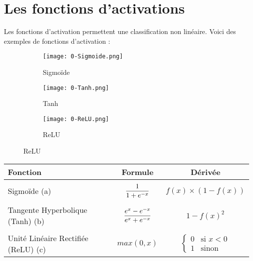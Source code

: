 \section{Les fonctions d'activations}
Les fonctions d'activation permettent une classification non linéaire. Voici des exemples de fonctions d'activation :
\begin{figure}[htbp!]
    \begin{subfigure}[]{0.32\textwidth}
        \texttt{[image: 0-Sigmoide.png]}
        \caption{Sigmoïde}
    \end{subfigure}
    \begin{subfigure}[]{0.32\textwidth}
        \texttt{[image: 0-Tanh.png]}
        \caption{Tanh}
    \end{subfigure}
    \begin{subfigure}[]{0.32\textwidth}
        \texttt{[image: 0-ReLU.png]}
        \caption{ReLU}
    \end{subfigure}
\end{figure}
\begin{center}
    \centering
    \begin{tabular}{ l || c | c | }
        Fonction                            & Formule                                          & Dérivée                                    \\ \hline \\
        Sigmoïde (a)                        & $\mathlarger{\frac{1}{1+e^{-x}}}$                & $f(x) \times (1-f(x))$                     \\ \\
        Tangente Hyperbolique (Tanh) (b)    & $\mathlarger{\frac{e^{x}-e^{-x}}{e^{x}+e^{-x}}}$ & $1-f(x)^2$                                 \\ \\
        Unité Linéaire Rectifiée (ReLU) (c) & $max(0, x)$                                      & $ \left\{\begin{array}{ll}
                0 & \mbox{si } x<0 \\
                1 & \mbox{sinon }\end{array}\right.$ \\
    \end{tabular}
\end{center}